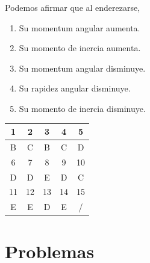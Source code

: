 \documentclass[letterpaper]{article}
\begin{document}
\begin{enumerate}
Podemos afirmar que al enderezarse,

\begin{enumerate}[label=\Alph*)]
\item Su momentum angular aumenta.
\item Su momento de inercia aumenta.
\item Su momentum angular disminuye.
\item Su rapidez angular disminuye.
\item Su momento de inercia disminuye.
\end{enumerate}

\end{enumerate}

\vspace{3cm}

\begin{center}
\begin{tabular}{|c|c|c|c|c|}
\hline
 1 & 2 & 3 & 4 & 5 \\ \hline
 B & C & B & C & D \\ \hline
 6 & 7 & 8 & 9 & 10 \\ \hline
 D & D & E & D & C \\ \hline
 11 & 12 & 13 & 14 & 15 \\ \hline
 E & E & D & E & / \\ \hline

\end{tabular}
\end{center}



\section*{Problemas}
\end{document}

